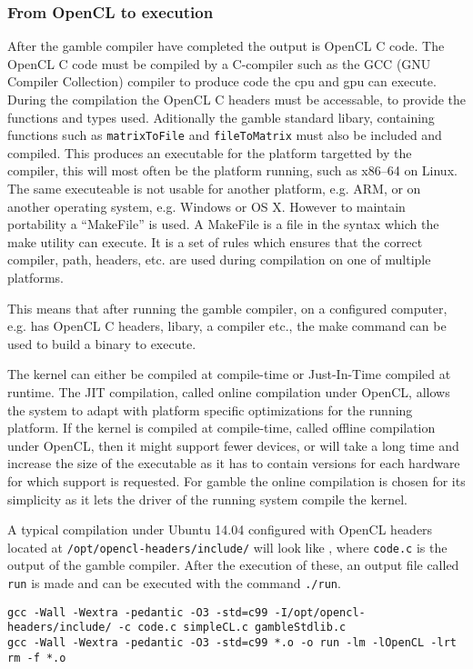 \subsubsection*{From OpenCL to execution}
After the \gls{gamble} compiler have completed the output is OpenCL C code.
The OpenCL C code must be compiled by a C-compiler such as the GCC (GNU Compiler Collection) compiler to produce code the \acrshort{cpu} and \acrshort{gpu} can execute.
During the compilation the OpenCL C headers must be accessable, to provide the functions and types used. 
Aditionally the \gls{gamble} standard libary, containing functions such as \texttt{matrixToFile} and \texttt{fileToMatrix} must also be included and compiled. 
This produces an executable for the platform targetted by the compiler, this will most often be the platform running, such as x86--64 on Linux.
The same executeable is not usable for another platform, e.g. ARM, or on another operating system, e.g. Windows or OS X. 
However to maintain portability a ``MakeFile'' is used. 
A MakeFile is a file in the syntax which the make utility can execute. 
It is a set of rules which ensures that the correct compiler, path, headers, etc. are used during compilation on one of multiple platforms. 

This means that after running the \gls{gamble} compiler, on a configured computer, e.g. has OpenCL C headers, libary, a compiler etc., the make command can be used to build a binary to execute.

The kernel can either be compiled at compile-time or Just-In-Time compiled at runtime.
The JIT compilation, called online compilation under OpenCL, allows the system to adapt with platform specific optimizations for the running platform.
If the kernel is compiled at compile-time, called offline compilation under OpenCL, then it might support fewer devices, or will take a long time and increase the size of the executable as it has to contain versions for each hardware for which support is requested. \citep{openclbookjit}
For \gls{gamble} the online compilation is chosen for its simplicity as it lets the driver of the running system compile the kernel. 

A typical compilation under Ubuntu 14.04 configured with OpenCL headers located at \texttt{/opt/opencl-headers/include/} will look like , where \texttt{code.c} is the output of the \gls{gamble} compiler.
After the execution of these, an output file called \texttt{run} is made and can be executed with the command \texttt{./run}. 

\begin{lstlisting}[caption=The commands executed by the make command according to the rules of the MakeFile,numbers=none,frame=tlrb,label={lst:makecommands}]
gcc -Wall -Wextra -pedantic -O3 -std=c99 -I/opt/opencl-headers/include/ -c code.c simpleCL.c gambleStdlib.c
gcc -Wall -Wextra -pedantic -O3 -std=c99 *.o -o run -lm -lOpenCL -lrt
rm -f *.o
\end{lstlisting}
